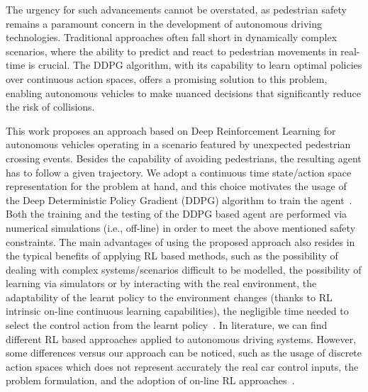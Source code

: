 The urgency for such advancements cannot be overstated, as pedestrian safety remains a paramount concern in the development of autonomous driving technologies. Traditional approaches often fall short in dynamically complex scenarios, where the ability to predict and react to pedestrian movements in real-time is crucial. The DDPG algorithm, with its capability to learn optimal policies over continuous action spaces, offers a promising solution to this problem, enabling autonomous vehicles to make nuanced decisions that significantly reduce the risk of collisions.


\newpage



This work proposes an approach based on Deep Reinforcement Learning for autonomous vehicles operating in a scenario featured by  unexpected pedestrian crossing events. Besides the capability of avoiding pedestrians, the resulting agent has to follow a given trajectory.  We adopt a continuous time state/action space representation for the problem at hand, and this choice motivates the usage of the Deep Deterministic Policy Gradient (DDPG) algorithm to train the agent~\cite{DDPG}.
Both the training and the testing of the DDPG based agent are performed via numerical simulations (i.e., off-line) in order to meet the above mentioned safety constraints. The main advantages of using the proposed approach also resides in the typical benefits of applying RL based methods, such as the possibility of dealing with complex systems/scenarios difficult to be modelled, the possibility of learning via simulators or by interacting with the real environment, the adaptability of the learnt policy to the environment changes (thanks to RL intrinsic on-line continuous learning capabilities), the negligible time needed to select the control action from the learnt policy~\cite{sutton2018reinforcement, bertsekas2021multiagent}. In literature, we can find different RL based approaches applied to autonomous driving systems. However, some differences versus our approach can be noticed, such as the usage of discrete action spaces which does not represent accurately the real car control inputs, the problem formulation, and the adoption of on-line RL approaches~\cite{everett2021collision, arvind2019autonomous}. 












